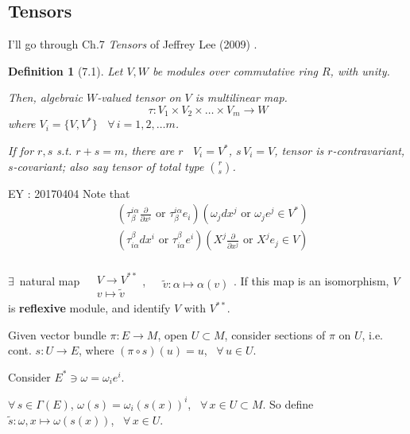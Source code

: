 \documentclass[10pt]{amsart}
\newtheorem{definition}{Definition}
\newcommand{\exercisehead}[1]
  { \smallskip
   \noindent{\small\bf Exercise #1.}
  }
\begin{document}
\begin{multicols*}{2}
\section{Tensors}

I'll go through Ch.7 \emph{Tensors} of Jeffrey Lee (2009) \cite{JLee2009}.  

\begin{definition}[7.1\cite{JLee2009}] Let $V,W$ be modules over commutative ring $R$, with unity.  

Then, algebraic $W$-valued tensor on $V$ is multilinear map.  
\begin{equation}
	\tau: V_1 \times V_2 \times \dots \times V_m \to W
\end{equation}
where $V_i = \lbrace V,V^* \rbrace$ \quad \, $ \forall \, i=1,2,\dots m$.  

If for $r,s$ s.t. $r+s =m$, there are $r$ \, $V_i = V^*$, $s \, V_i = V$, tensor is $r$-contravariant, $s$-covariant; also say tensor of total type $\binom{r}{s}$.  
\end{definition}

EY : 20170404 Note that 
\[
\begin{aligned}
	& ( \tau_{\beta}^{i\alpha} \frac{ \partial }{ \partial x^i } \text{ or } \tau_{\beta}^{i\alpha} e_i )(\omega_j dx^j \text{ or } \omega_je^j  \in V^*) \\ 
	& ( \tau^{\beta}_{i\alpha} dx^i \text{ or } \tau^{\beta}_{i\alpha} e^i )( X^j \frac{ \partial }{ \partial x^j} \text{ or } X^j e_j  \in V) 
\end{aligned}
\]

$\exists \,$ natural map $\begin{aligned} & \quad \\ 
	& V\to V^{**} \\ 
& v \mapsto \widetilde{v} \end{aligned}$,  $\begin{aligned} & \quad \\ 
	& \widetilde{v} : \alpha \mapsto \alpha(v) \end{aligned}$.  If this map is an isomorphism, $V$ is \textbf{reflexive} module, and identify $V$ with $V^{**}$.  

\exercisehead{7.5} Given vector bundle $\pi: E \to M$, open $U\subset M$, consider sections of $\pi$ on $U$, i.e. cont. $s:U\to E$, where $(\pi\circ s)(u)=u$, \, $\forall \, u \in U$.  

Consider $E^* \ni \omega =\omega_i e^i$.  

$\forall \, s\in \Gamma(E)$, $\omega(s) = \omega_i(s(x))^i$, \, $\forall \, x \in U\subset M$.  So define $\widetilde{s}: \omega,x\mapsto \omega(s(x))$, \, $\forall \, x \in U$.  


\end{multicols*}
\end{document}
